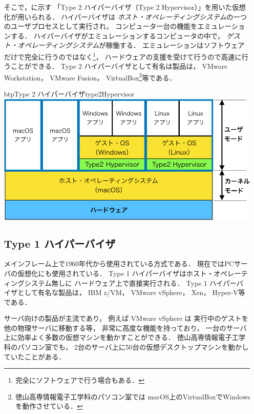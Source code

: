 そこで，に示す
「Type 2 ハイパーバイザ（Type 2 Hypervisor）」を用いた仮想化が用いられる．
ハイパーバイザは
\emph{ホスト・オペレーティングシステム}の一つのユーザプロセスとして実行され，
コンピュータ一台の機能をエミュレーションする．
ハイパーバイザがエミュレーションするコンピュータの中で，
\emph{ゲスト・オペレーティングシステム}が稼働する．
エミュレーションはソフトウェアだけで完全に行うのではなく\footnote{
  完全にソフトウェアで行う場合もある．}，
ハードウェアの支援を受けて行うので高速に行うことができる\cite{virtualization}．
Type 2 ハイパーバイザとして有名は製品は，
VMware Workstation，
VMware Fusion，
VirtualBox\footnote{
  徳山高専情報電子工学科のパソコン室では
  macOS上のVirtualBoxでWindowsを動作させている．
}等である．

\begin{myfig}{btp}{Type 2 ハイパーバイザ}{type2Hypervisor}
  \includegraphics[scale=0.66]{Fig/type2Hypervisor-crop.pdf}
\end{myfig}

\subsection{Type 1 ハイパーバイザ}
メインフレーム上で1960年代から使用されている方式である．
現在ではPCサーバの仮想化にも使用されている．
Type 1 ハイパーバイザはホスト・オペレーティングシステム無しに
ハードウェア上で直接実行される．
Type 1 ハイパーバイザとして有名な製品は，
IBM z/VM，
VMware vSphere，
Xen，
Hyper-V等である．

サーバ向けの製品が主流であり，
例えば VMware vSphere は
実行中のゲストを他の物理サーバに移動する等，
非常に高度な機能を持っており\cite{vsphere}，
一台のサーバ上に効率よく多数の仮想マシンを動かすことができる．
徳山高専情報電子工学科のパソコン室でも，
2台のサーバ上に50台の仮想デスクトップマシンを動かしていたことがある．

